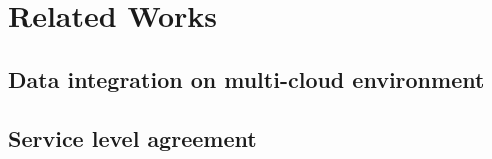 \section{Related Works}\label{sec:rw}

\subsection{Data integration on multi-cloud environment}

\subsection{Service level agreement}
